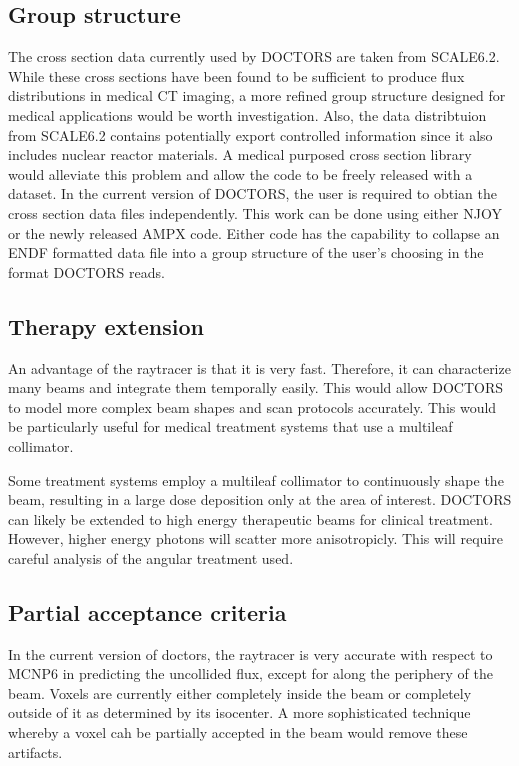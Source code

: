 \subsection{Group structure}
The cross section data currently used by DOCTORS are taken from SCALE6.2. While these cross sections have been found to be sufficient to produce flux distributions in medical CT imaging, a more refined group structure designed for medical applications would be worth investigation. Also, the data distribtuion from SCALE6.2 contains potentially export controlled information since it also includes nuclear reactor materials. A medical purposed cross section library would alleviate this problem and allow the code to be freely released with a dataset. In the current version of DOCTORS, the user is required to obtian the cross section data files independently. This work can be done using either NJOY or the newly released AMPX code. Either code has the capability to collapse an ENDF formatted data file into a group structure of the user's choosing in the format DOCTORS reads.

\subsection{Therapy extension}
An advantage of the raytracer is that it is very fast. Therefore, it can characterize many beams and integrate them temporally easily. This would allow DOCTORS to model more complex beam shapes and scan protocols accurately. This would be particularly useful for medical treatment systems that use a multileaf collimator.

Some treatment systems employ a multileaf collimator to continuously shape the beam, resulting in a large dose deposition only at the area of interest. DOCTORS can likely be extended to high energy therapeutic beams for clinical treatment. However, higher energy photons will scatter more anisotropicly. This will require careful analysis of the angular treatment used.

\subsection{Partial acceptance criteria}
In the current version of doctors, the raytracer is very accurate with respect to MCNP6 in predicting the uncollided flux, except for along the periphery of the beam. Voxels are currently either completely inside the beam or completely outside of it as determined by its isocenter. A more sophisticated technique whereby a voxel cah be partially accepted in the beam would remove these artifacts.

